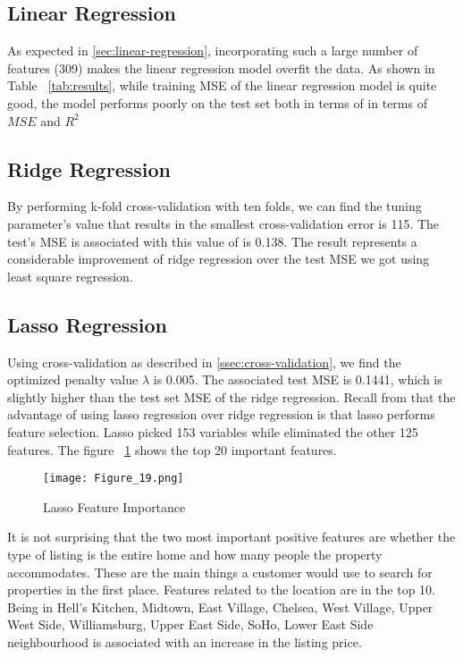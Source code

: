 \subsection{Linear Regression}

As expected in \ref{sec:linear-regression}, incorporating such a large number of
features (309) makes the linear regression model overfit the data. As shown in
Table ~\ref{tab:results}, while training MSE of the linear regression model is
quite good, the model performs poorly on the test set both in terms of   in
terms of $MSE$ and $R^2$

\subsection{Ridge Regression}

By performing k-fold cross-validation with ten folds, we can find the tuning
parameter's value that results in the smallest cross-validation error is 115.
The test's MSE is associated with this value of  is 0.138.  The result
represents a considerable improvement of ridge regression over the test MSE we
got using least square regression.


\subsection{Lasso Regression}

Using cross-validation as described in \ref{ssec:cross-validation}, we find the
optimized penalty value $\lambda$ is 0.005. The associated test MSE is 0.1441,
which is slightly higher than the test set MSE of the ridge regression.  Recall
from that the advantage of using lasso regression over ridge regression is that
lasso performs feature selection.
Lasso picked 153 variables while eliminated the other 125 features.
The figure ~\ref{fig:lasso-feature-importantance} shows the top 20 important features.

\begin{figure}[H]\centering
    \caption{Lasso Feature Importance}
    \texttt{[image: Figure\_19.png]}
    \label{fig:lasso-feature-importantance}
\end{figure}


It is not surprising that the two most important positive features are whether
the type of listing is the entire home and how many people the property
accommodates. These are the main things a customer would use to search for
properties in the first place.
Features related to the location are in the top 10.  Being in  Hell's
Kitchen, Midtown, East Village, Chelsea, West Village, Upper West Side,
Williamsburg, Upper East Side, SoHo, Lower East Side neighbourhood is associated
with an increase in the listing price.

